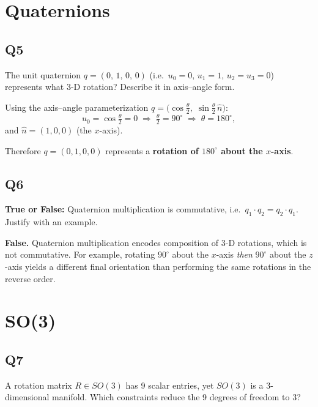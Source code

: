 \documentclass[12pt]{article}
\begin{document}
\section*{Quaternions}

\subsection*{Q5}
The unit quaternion $q=(0,\,1,\,0,\,0)$ (i.e.\ $u_0=0,\,u_1=1,\,u_2=u_3=0$)
represents what 3-D rotation?  Describe it in axis--angle form.

\begin{answerbox}
Using the axis--angle parameterization
$q=\bigl(\cos\tfrac{\theta}{2},\;\sin\tfrac{\theta}{2}\,\hat{n}\bigr)$:
\[
  u_0 = \cos\tfrac{\theta}{2} = 0
  \;\Longrightarrow\;
  \tfrac{\theta}{2} = 90^\circ
  \;\Longrightarrow\;
  \theta = 180^\circ,
\]
and $\hat{n}=(1,0,0)$ (the $x$-axis).

Therefore $q=(0,1,0,0)$ represents a \textbf{rotation of $180^\circ$ about the
$x$-axis}.
\end{answerbox}

\subsection*{Q6}
\textbf{True or False:} Quaternion multiplication is commutative, i.e.\
$q_1\cdot q_2 = q_2\cdot q_1$.  Justify with an example.

\begin{answerbox}
\textbf{False.}  Quaternion multiplication encodes composition of 3-D rotations,
which is not commutative.  For example, rotating $90^\circ$ about the $x$-axis
\emph{then} $90^\circ$ about the $z$-axis yields a different final orientation
than performing the same rotations in the reverse order.
\end{answerbox}

\section*{SO(3)}

\subsection*{Q7}
A rotation matrix $R\in SO(3)$ has 9 scalar entries, yet $SO(3)$ is a
3-dimensional manifold.  Which constraints reduce the 9 degrees of freedom to 3?
\end{document}
